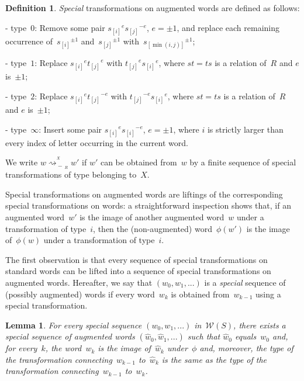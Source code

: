 \documentclass{amsart}
\numberwithin{equation}{section}
\theoremstyle{plain}
\newtheorem{lemm}[prop]{Lemma}
\theoremstyle{definition}
\newtheorem{defi}[prop]{Definition}
\begin{document}
\begin{defi}
\emph{Special} transformations on augmented words are defined as follows:

- type~$0$: Remove some pair ${{s}_{[{i}]}}^{e} {{s}_{[{j}]}}^{-{e}}$, ${e} = \pm1$, and replace each remaining occurrence of~${{s}_{[{i}]}}^{\pm1}$ and~${{s}_{[{j}]}}^{\pm1}$ with~${{s}_{[{\min({i}, {j})}]}}^{\pm1}$;

- type~$1$: Replace ${{s}_{[{i}]}}^{e} {{t}_{[{j}]}}^{e}$ with ${{t}_{[{j}]}}^{e} {{s}_{[{i}]}}^{e}$, where ${s} {t} = {t} {s}$ is a relation of~${R}$ and ${e}$ is~$\pm1$;

- type~$2$: Replace ${{s}_{[{i}]}}^{e} {{t}_{[{j}]}}^{-{e}}$ with ${{t}_{[{j}]}}^{-{e}} {{s}_{[{i}]}}^{e}$, where ${s} {t} = {t} {s}$ is a relation of~${R}$ and ${e}$ is~$\pm1$;

- type~$\infty$: Insert some pair ${{s}_{[{i}]}}^{e} {{s}_{[{i}]}}^{-{e}}$, ${e} = \pm1$, where ${i}$ is strictly larger than every index of letter occurring in the current word.

\noindent 
We write ${w} {\mathrel{\overset{{}_{{X}}}{\rightsquigarrow_{\!\!\!\!\!\!-\,{{\!{}_{R}}}}}}} {w}'$ if ${w}'$ can be obtained from~${w}$ by a finite sequence of special transformations of type belonging to~$X$.
\end{defi}

Special transformations on augmented words are liftings of the corresponding special transformations on words: a straightforward inspection shows that, if an augmented word~${w}'$ is the image of another augmented word~${w}$ under a transformation of type~${i}$, then the (non-augmented) word~$\phi({w}')$ is the image of~$\phi({w})$ under a transformation of type~${i}$.

The first observation is that every sequence of special transformations on standard words can be lifted into a sequence of special transformations on augmented words. Hereafter, we say that $({w}_0, {w}_1, ...)$ is a \emph{special} sequence of (possibly augmented) words if every word~${w}_{k}$ is obtained from~${w}_{{k}-1}$ using a special transformation.

\begin{lemm}
\label{L:Lift}
For every special sequence $({w}_0, {w}_1, ...)$ in~$ {\mathcal{W}({S})}$, there exists a special sequence of augmented words $({\widehat{w}}_0, {\widehat{w}}_1, ...)$ such that ${\widehat{w}}_0$ equals~${w}_0$ and, for every~${k}$, the word~${w}_{k}$ is the image of~${\widehat{w}}_{k}$ under~$\phi$ and, moreover, the type of the transformation connecting~${\widehat{w}}_{{k}-1}$ to~${\widehat{w}}_{k}$ is the same as the type of the transformation connecting~${w}_{{k}-1}$ to~${w}_{k}$.
\end{lemm}
\end{document}
